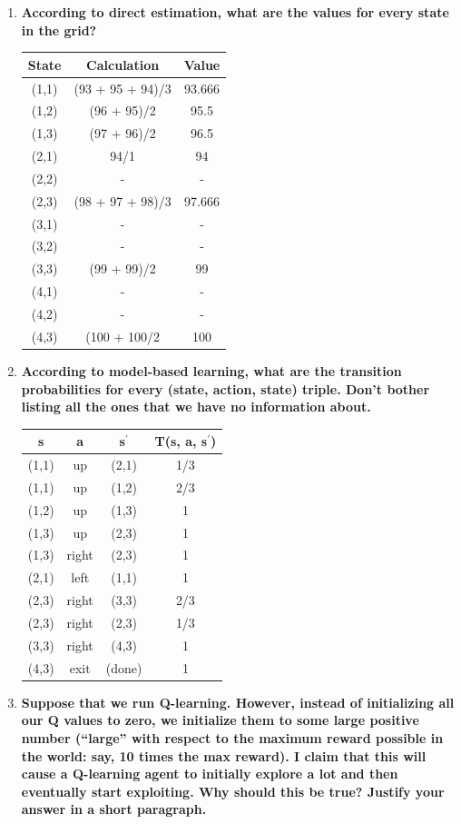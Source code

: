 \documentclass[fleqn]{hw}
\begin{document}
\begin{enumerate}
    \item {\bf According to direct estimation, what are the values for every state in the grid?}

\begin{center}
\begin{tabular}{c|c|c}
    {\bf State} & {\bf Calculation} & {\bf Value} \\
\hline
    (1,1) & (93 + 95 + 94)/3 & 93.666 \\
    (1,2) & (96 + 95)/2&95.5 \\
    (1,3) & (97 + 96)/2&96.5 \\
    (2,1) & 94/1&94 \\
    (2,2) & -&- \\
    (2,3) & (98 + 97 + 98)/3&97.666 \\
    (3,1) & -&- \\
    (3,2) & -&- \\
    (3,3) & (99 + 99)/2&99 \\
    (4,1) & -&- \\
    (4,2) & -&- \\
    (4,3) & (100 + 100/2&100 \\
\end{tabular}
\end{center}

    \item {\bf According to model-based learning, what are the transition
probabilities for every (state, action, state) triple.  Don't bother
        listing all the ones that we have no information about. }

\begin{center}
\begin{tabular}{c|c|c|c}
{\bf s} & {\bf a} & {\bf s$^\prime$} & {\bf T(s, a, s$^\prime$)} \\
\hline
(1,1) & up & (2,1) & 1/3\\
(1,1) & up & (1,2) & 2/3\\
(1,2) & up & (1,3) & 1\\
(1,3) & up & (2,3) & 1\\
(1,3) & right & (2,3) & 1\\
(2,1) & left & (1,1) & 1\\
(2,3) & right & (3,3) & 2/3\\
(2,3) & right & (2,3) & 1/3\\
(3,3) & right & (4,3) & 1\\
(4,3) & exit & (done) & 1\\
\end{tabular}
\end{center}

\item {\bf Suppose that we run Q-learning.  However, instead of initializing all
our Q values to zero, we initialize them to some large positive number
(``large'' with respect to the maximum reward possible in the world:
say, 10 times the max reward).  I claim that this will cause a
Q-learning agent to initially explore a lot and then eventually start
exploiting.  Why should this be true?  Justify your answer in a short
        paragraph.}
\end{enumerate}
\end{document}
